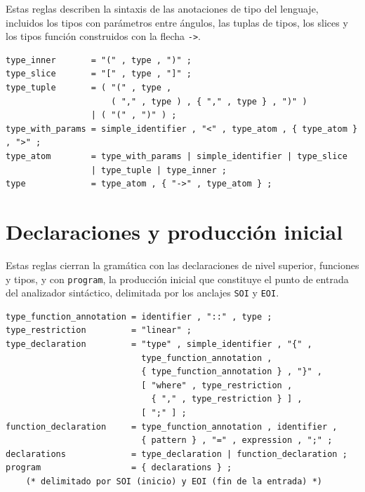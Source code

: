 Estas reglas describen la sintaxis de las anotaciones de tipo del lenguaje, incluidos los tipos con parámetros entre ángulos, las tuplas de tipos, los slices y los tipos función construidos con la flecha \lstinline|->|.

\begin{lstlisting}[language={}, caption=Reglas del sistema de tipos]
type_inner       = "(" , type , ")" ;
type_slice       = "[" , type , "]" ;
type_tuple       = ( "(" , type ,
                     ( "," , type ) , { "," , type } , ")" )
                 | ( "(" , ")" ) ;
type_with_params = simple_identifier , "<" , type_atom , { type_atom } , ">" ;
type_atom        = type_with_params | simple_identifier | type_slice
                 | type_tuple | type_inner ;
type             = type_atom , { "->" , type_atom } ;
\end{lstlisting}

\section{Declaraciones y producción inicial}
\label{sec:ebnf-declaraciones}

Estas reglas cierran la gramática con las declaraciones de nivel superior, funciones y tipos, y con \lstinline|program|, la producción inicial que constituye el punto de entrada del analizador sintáctico, delimitada por los anclajes \lstinline|SOI| y \lstinline|EOI|.

\begin{lstlisting}[language={}, caption=Reglas de declaraciones y producción inicial]
type_function_annotation = identifier , "::" , type ;
type_restriction         = "linear" ;
type_declaration         = "type" , simple_identifier , "{" ,
                           type_function_annotation ,
                           { type_function_annotation } , "}" ,
                           [ "where" , type_restriction ,
                             { "," , type_restriction } ] ,
                           [ ";" ] ;
function_declaration     = type_function_annotation , identifier ,
                           { pattern } , "=" , expression , ";" ;
declarations             = type_declaration | function_declaration ;
program                  = { declarations } ;
    (* delimitado por SOI (inicio) y EOI (fin de la entrada) *)
\end{lstlisting}
